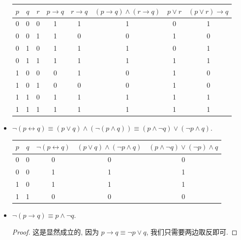 \documentclass[10pt,UTF8]{ctexbook} %
\begin{document}
\begin{exercise}
\begin{itemize}[itemsep=0pt]
\begin{table}[H]
\begin{tabular}{cccccccc}
                \hline
                $p$ & $q$ & $r$ & $p \to q$ & $r \to q$ & $(p \to q) \wedge (r \to q)$ & $p \vee r$ & $(p \vee r) \to q$ \\ 
                \hline
                0 & 0 & 0 & 1 & 1 & 1 & 0 & 1 \\ 
                0 & 0 & 1 & 1 & 0 & 0 & 1 & 0 \\ 
                0 & 1 & 0 & 1 & 1 & 1 & 0 & 1 \\
                0 & 1 & 1 & 1 & 1 & 1 & 1 & 1 \\
                1 & 0 & 0 & 0 & 1 & 0 & 1 & 0 \\
                1 & 0 & 1 & 0 & 0 & 0 & 1 & 0 \\
                1 & 1 & 0 & 1 & 1 & 1 & 1 & 1 \\
                1 & 1 & 1 & 1 & 1 & 1 & 1 & 1 \\
                \hline 
            \end{tabular}
        \end{table}
        \item $\lnot(p \leftrightarrow q) \equiv (p \vee q) \wedge (\lnot(p \wedge q)) \equiv (p \wedge \lnot q)\vee(\lnot p \wedge q)$.
        \begin{table}[H]
            \centering
            \begin{tabular}{ccccc}
                \hline
                $p$ & $q$ & $\lnot(p \leftrightarrow q)$ & $(p \vee q) \wedge (\lnot p \wedge q)$ & $(p \wedge \lnot q) \vee (\lnot p) \wedge q$ \\
                \hline 
                0 & 0 & 0 & 0 & 0 \\
                0 & 0 & 1 & 1 & 1 \\
                1 & 0 & 1 & 1 & 1 \\
                1 & 1 & 0 & 0 & 0 \\
                \hline
            \end{tabular}
        \end{table}
        \item $\lnot (p \to q) \equiv p \wedge \lnot q$.
        \begin{proof}
            这是显然成立的, 因为 $p \to q \equiv \lnot p \vee q$, 我们只需要两边取反即可.
        \end{proof}
    \end{itemize}
\end{exercise}
\end{document}
